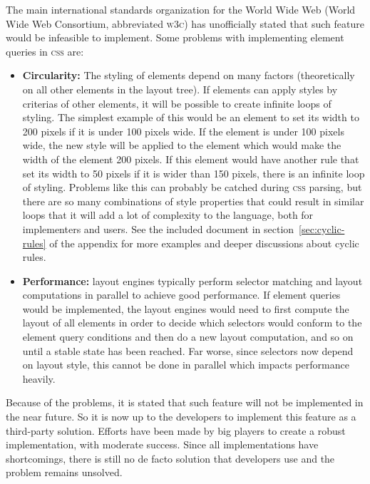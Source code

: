\documentclass[a4paper,11pt]{kth-mag}
\begin{document}
      The main international standards organization for the World Wide Web (World Wide Web Consortium, abbreviated \textsc{w3c}) has unofficially stated that such feature would be infeasible to implement.
      Some problems with implementing element queries in \textsc{css} are:
      \begin{itemize}
        \item \textbf{Circularity:} The styling of elements depend on many factors (theoretically on all other elements in the layout tree).
        If elements can apply styles by criterias of other elements, it will be possible to create infinite loops of styling.
        The simplest example of this would be an element to set its width to 200 pixels if it is under 100 pixels wide.
        If the element is under 100 pixels wide, the new style will be applied to the element which would make the width of the element 200 pixels.
        If this element would have another rule that set its width to 50 pixels if it is wider than 150 pixels, there is an infinite loop of styling.
        Problems like this can probably be catched during \textsc{css} parsing, but there are so many combinations of style properties that could result in similar loops that it will add a lot of complexity to the language, both for implementers and users.
        See the included document in section~\ref{sec:cyclic-rules} of the appendix for more examples and deeper discussions about cyclic rules.
        \item \textbf{Performance:} layout engines typically perform selector matching and layout computations in parallel to achieve good performance.
        If element queries would be implemented, the layout engines would need to first compute the layout of all elements in order to decide which selectors would conform to the element query conditions and then do a new layout computation, and so on until a stable state has been reached.
        Far worse, since selectors now depend on layout style, this cannot be done in parallel which impacts performance heavily.
      \end{itemize}
      Because of the problems, it is stated that such feature will not be implemented in the near future. So it is now up to the developers to implement this feature as a third-party solution. 
      Efforts have been made by big players to create a robust implementation, with moderate success. 
      Since all implementations have shortcomings, there is still no de facto solution that developers use and the problem remains unsolved.
\end{document}
